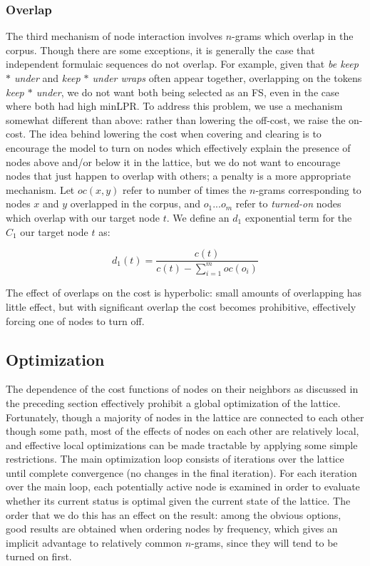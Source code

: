 \documentclass[11pt,letterpaper]{article}
\newcommand{\dotts}{...}
\newcommand{\gap}{$*$\xspace}
\newcommand{\ex}[1]{\textit{#1}\xspace}
\newcommand{\termemph}[1]{\textit{#1}\xspace}
\begin{document}
\subsubsection{Overlap}

The third mechanism of node interaction involves $n$-grams which overlap in the corpus. Though there are some exceptions, it is generally the case that independent formulaic sequences do not overlap. For example, given that \ex{be keep \gap under} and \ex{keep \gap under wraps} often appear together, overlapping on the tokens \ex{keep \gap under}, we do not want both being selected as an FS, even in the case where both had high minLPR. To address this problem, we use a mechanism somewhat different than above: rather than lowering the off-cost, we raise the on-cost. The idea behind lowering the cost when covering and clearing is to encourage the model to turn on nodes which effectively explain the presence of nodes above and/or below it in the lattice, but we do not want to encourage nodes that just happen to overlap with others; a penalty is a more appropriate mechanism. Let $oc(x,y)$ refer to number of times the $n$-grams corresponding to nodes $x$ and $y$ overlapped in the corpus, and $o_1\dotts o_m$ refer to \termemph{turned-on} nodes which overlap with our target node $t$. We define an $d_1$ exponential term for the $C_1$ our target node $t$ as:

\begin{displaymath}
d_{1}(t) = \frac{c(t)}{c(t) - \sum_{i=1}^{m}{oc(o_i)}}
\end{displaymath}

The effect of overlaps on the cost is hyperbolic: small amounts of overlapping has little effect, but with significant overlap the cost becomes prohibitive, effectively forcing one of nodes to turn off. 

 
\subsection{Optimization}

The dependence of the cost functions of nodes on their neighbors as discussed in the preceding section effectively prohibit a global optimization of the lattice. Fortunately, though a majority of nodes in the lattice are connected to each other though some path, most of the effects of nodes on each other are relatively local, and effective local optimizations can be made tractable by applying some simple restrictions. The main optimization loop consists of iterations over the lattice until complete convergence (no changes in the final iteration). For each iteration over the main loop, each potentially active node is examined in order to evaluate whether its current status is optimal given the current state of the lattice. The order that we do this has an effect on the result: among the obvious options, good results are obtained when ordering nodes by frequency, which gives an implicit advantage to relatively common $n$-grams, since they will tend to be turned on first.
\end{document}
